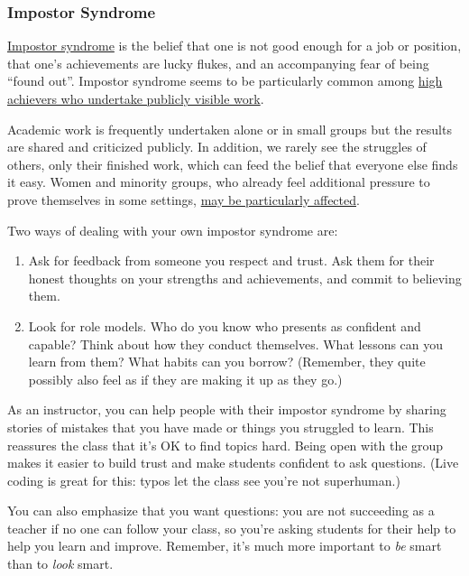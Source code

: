 \subsubsection*{Impostor Syndrome}

\href{https://en.wikipedia.org/wiki/Impostor\_syndrome}{Impostor syndrome} is the belief that one is not good enough for a job or position,
that one's achievements are lucky flukes,
and an accompanying fear of being ``found out''.
Impostor syndrome seems to be particularly common among
\href{https://www.usenix.org/blog/impostor-syndrome-proof-yourself-and-your-community}{high achievers who undertake publicly visible work}.

Academic work is frequently undertaken alone or in small groups but the results are shared and criticized publicly.
In addition,
we rarely see the struggles of others,
only their finished work,
which can feed the belief that everyone else finds it easy.
Women and minority groups,
who already feel additional pressure to prove themselves in some settings,
\href{http://www.paulineroseclance.com/pdf/ip\_high\_achieving\_women.pdf}{may be particularly affected}.

Two ways of dealing with your own impostor syndrome are:

\begin{enumerate}
\item Ask for feedback from someone you respect and trust.
Ask them for their honest thoughts on your strengths and achievements,
and commit to believing them.
\item Look for role models.
Who do you know who presents as confident and capable?
Think about how they conduct themselves.
What lessons can you learn from them?
What habits can you borrow?
(Remember, they quite possibly also feel as if they are making it up as they go.)
\end{enumerate}

As an instructor,
you can help people with their impostor syndrome by
sharing stories of mistakes that you have made or things you struggled to learn.
This reassures the class that it's OK to find topics hard.
Being open with the group makes it easier to build trust and make students confident to ask questions.
(Live coding is great for this:
typos let the class see you're not superhuman.)

You can also emphasize that you want questions:
you are not succeeding as a teacher if no one can follow your class,
so you're asking students for their help to help you learn and improve.
Remember,
it's much more important to \emph{be} smart than to \emph{look} smart.

